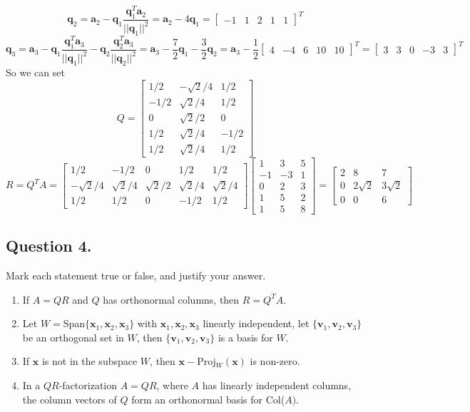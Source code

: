 \documentclass{article}
\begin{document}
\[\mathbf{q}_2=\mathbf{a}_2-\mathbf{q}_1\frac{\mathbf{q}_1^T\mathbf{a}_2}{||\mathbf{q}_1||^2}=\mathbf{a}_2-4\mathbf{q}_1=[\begin{array}{rrrrr}-1&1&2&1&1\end{array}]^T\]
\[\mathbf{q}_3=\mathbf{a}_3-\mathbf{q}_1\frac{\mathbf{q}_1^T\mathbf{a}_3}{||\mathbf{q}_1||^2}-\mathbf{q}_2\frac{\mathbf{q}_2^T\mathbf{a}_3}{||\mathbf{q}_2||^2}=\mathbf{a}_3-\frac{7}{2}\mathbf{q}_1-\frac{3}{2}\mathbf{q}_2=\mathbf{a}_3-\frac{1}{2}[\begin{array}{rrrrr}4&-4&6&10&10\end{array}]^T=[\begin{array}{rrrrr}3&3&0&-3&3\end{array}]^T\]
So we can set
\[Q=
\left[
\begin{array}{rrr}
 1/2 &-\sqrt{2}/4 & 1/2 \\
-1/2 & \sqrt{2}/4 & 1/2 \\
 0   & \sqrt{2}/2 & 0   \\
 1/2 & \sqrt{2}/4 &-1/2 \\
 1/2 & \sqrt{2}/4 & 1/2
\end{array}
\right]
\]
\[
R=Q^TA=
\left[
\begin{array}{rrrrr}
 1/2        &       -1/2 &          0 &         1/2 & 1/2 \\
-\sqrt{2}/4 & \sqrt{2}/4 & \sqrt{2}/2 & \sqrt{2}/4 & \sqrt{2}/4 \\
 1/2        &        1/2 & 0          & -1/2       & 1/2  
\end{array}
\right]
\left[
\begin{array}{rrr}
 1 & 3 & 5 \\
-1 &-3 & 1 \\
 0 & 2 & 3 \\
 1 & 5 & 2 \\
 1 & 5 & 8
\end{array}
\right]
=
\left[
\begin{array}{rrr}
 2 & 8 & 7 \\
 0 & 2\sqrt{2} & 3\sqrt{2} \\
 0 &0 & 6
\end{array}
\right]
\]
\subsection*{Question 4.}
Mark each statement true or false, and justify your answer.
\begin{enumerate} [label=(\arabic*)]
    \item If $A=QR$ and $Q$ has orthonormal columns, then $R=Q^TA$.
    \item Let $W=$Span$\{\mathbf{x}_1,\mathbf{x}_2,\mathbf{x}_3\}$ with $\mathbf{x}_1,\mathbf{x}_2,\mathbf{x}_3$ linearly independent, let $\{\mathbf{v}_1,\mathbf{v}_2,\mathbf{v}_3\}$ be an orthogonal set in $W$, then $\{\mathbf{v}_1,\mathbf{v}_2,\mathbf{v}_3\}$ is a basis for $W$.
    \item If $\mathbf{x}$ is not in the subspace $W$, then $\mathbf{x}-$Proj$_W(\mathbf{x})$ is non-zero.
    \item In a $QR$-factorization $A=QR$, where $A$ has linearly independent columns, the column vectors of $Q$ form an orthonormal basis for Col($A)$.
\end{enumerate}
\end{document}
